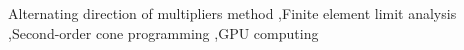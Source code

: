 \documentclass[preprint,12pt]{elsarticle}
\begin{document}
\begin{frontmatter}
\begin{highlights}
\end{highlights}

\begin{keyword}
Alternating direction of multipliers method \sep Finite element limit analysis \sep Second-order cone programming \sep GPU computing


\end{keyword}

\end{frontmatter}























\end{document}
